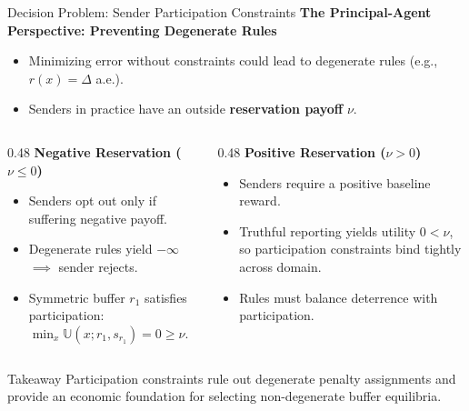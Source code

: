 \documentclass[aspectratio=169, 11pt, t, xcolor=table]{beamer}
\begin{document}
\begin{frame}{Decision Problem: Sender Participation Constraints}
\small
\textbf{The Principal-Agent Perspective: Preventing Degenerate Rules}
\begin{itemize}\itemsep=0.5pt
  \item Minimizing error without constraints could lead to degenerate rules (e.g., $r(x) = \Delta$ a.e.).
  \item Senders in practice have an outside \textbf{reservation payoff} $\nu$.
\end{itemize}
\vspace{0.15em}
\begin{columns}[T,onlytextwidth]
\begin{column}{0.48\textwidth}
\textcolor{IITBNavy}{\textbf{Negative Reservation ($\nu \le 0$)}}
\begin{itemize}\itemsep=0.5pt
  \footnotesize
  \item Senders opt out only if suffering negative payoff.
  \item Degenerate rules yield $-\infty$ $\implies$ sender rejects.
  \item Symmetric buffer $r_1$ satisfies participation:
    $\min_{x} \mathbb{U}(x; r_1, s_{r_1}) = 0 \ge \nu$.
\end{itemize}
\end{column}
\begin{column}{0.48\textwidth}
\textcolor{IITBNavy}{\textbf{Positive Reservation ($\nu > 0$)}}
\begin{itemize}\itemsep=0.5pt
  \footnotesize
  \item Senders require a positive baseline reward.
  \item Truthful reporting yields utility $0 < \nu$, so participation constraints bind tightly across domain.
  \item Rules must balance deterrence with participation.
\end{itemize}
\end{column}
\end{columns}
\vspace{0.15em}
\begin{block}{Takeaway}
\footnotesize
Participation constraints rule out degenerate penalty assignments and provide an economic foundation for selecting non-degenerate buffer equilibria.
\end{block}
\end{frame}
\end{document}
